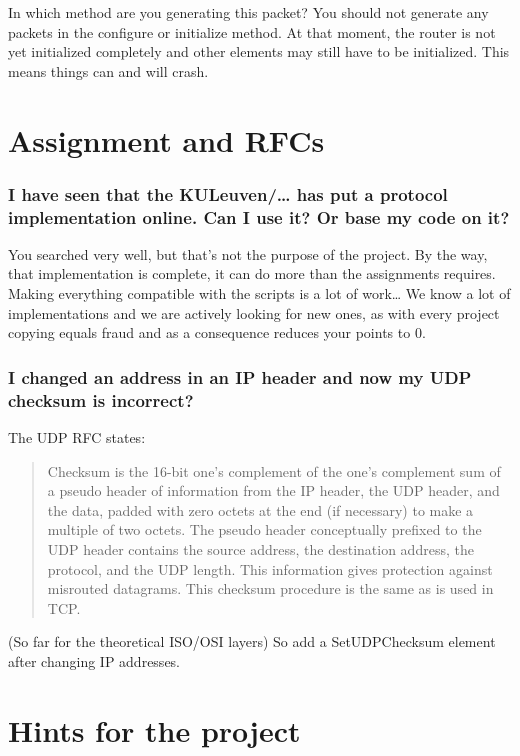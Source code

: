 \documentclass[a4paper]{article}
\begin{document}
In which method are you generating this packet? You should not generate
any packets in the configure or initialize method. At that moment, the
router is not yet initialized completely and other elements may still
have to be initialized. This means things can and will crash.

\section{Assignment and RFCs}

\subsubsection*{I have seen that the KULeuven/\ldots{} has put a protocol implementation
online. Can I use it? Or base my code on it?}

You searched very well, but that's not the purpose of the project. By
the way, that implementation is complete, it can do more than the
assignments requires. Making everything compatible with the scripts is a
lot of work\ldots{} We know a lot of implementations and we are actively
looking for new ones, as with every project copying equals fraud and as
a consequence reduces your points to 0.

\subsubsection*{I changed an address in an IP header and now my UDP checksum is
incorrect?}

The UDP RFC states:

\begin{quote}
Checksum is the 16-bit one's complement of the one's complement sum of a
pseudo header of information from the IP header, the UDP header, and the
data, padded with zero octets at the end (if necessary) to make a
multiple of two octets. The pseudo header conceptually prefixed to the
UDP header contains the source address, the destination address, the
protocol, and the UDP length. This information gives protection against
misrouted datagrams. This checksum procedure is the same as is used in
TCP.
\end{quote}

(So far for the theoretical ISO/OSI layers) So add a SetUDPChecksum
element after changing IP addresses.

\section{Hints for the project}
\end{document}
